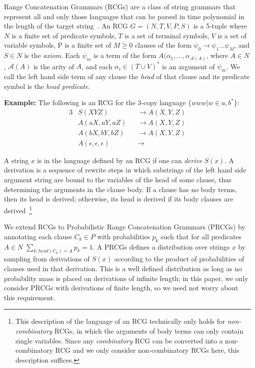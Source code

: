 \documentclass{article}
\begin{document}
Range Concatenation Grammars (RCGs) are a class of string grammars
that represent all and only those languages that can be parsed in time
polynomial in the length of the target
string~\cite{boullier2005range}. An RCG $G=(N, T, V, P, S)$ is a
5-tuple where $N$ is a finite set of predicate symbols, $T$ is a set
of terminal symbols, $V$ is a set of variable symbols, P is a finite
set of $M \geq 0$ clauses of the form $\psi_0 \rightarrow \psi_1 \dots
\psi_M$, and $S \in N$ is the \emph{axiom}. Each $\psi_m$ is a term of
the form $A(\alpha_1, \dots, \alpha_{\mathcal{A}(A)}$, where $A \in
N$, $\mathcal{A}(A)$ is the arity of $A$, and each $\alpha_i \in (T
\cup V)^*$ is an argument of $\psi_m$. We call the left hand side term
of any clause the \emph{head} of that clause and its predicate symbol
is the \emph{head predicate}.

\textbf{Example:} The following is an RCG for the 3-copy language
$\{www | w \in {a, b}^*\}$:
\begin{alignat*}{3}
&S(XYZ) &&\rightarrow A(X, Y, Z)\\
&A(aX, aY, aZ) &&\rightarrow A(X, Y, Z)\\
&A(bX, bY, bZ) &&\rightarrow A(X, Y, Z)\\
&A(\epsilon, \epsilon, \epsilon) &&\rightarrow 
\end{alignat*}

A string $x$ is in the language defined by an RCG if one can
\emph{derive} $S(x)$. A derivation is a sequence of rewrite steps in
which substrings of the left hand side argument string are bound to
the variables of the head of some clause, thus determining the
arguments in the clause body. If a clause has no body terms, then its
head is derived; otherwise, its head is derived if its body clauses
are derived~\footnote{This description of the language of an RCG
  technically only holds for \emph{non-combinatory} RCGs, in which the
  arguments of body terms can only contain single variables. Since any
  \emph{combinatory} RCG can be converted into a non-combinatory RCG
  and we only consider non-combinatory RCGs here, this description
  suffices.}

We extend RCGs to Probabilistic Range Concatenation Grammars (PRCGs)
by annotating each clause $C_k \in P$ with probabilities $p_k$ such
that for all predicates $A \in N$ $\sum_{k:head(C_k)=A} p_k = 1$. A
PRCGs defines a distribution over strings $x$ by sampling from
derivations of $S(x)$ according to the product of probabilities of
clauses used in that derivation. This is a well defined distribution
as long as no probability mass is placed on derivations of infinite
length; in this paper, we only consider PRCGs with derivations of
finite length, so we need not worry about this requirement.
\end{document}
